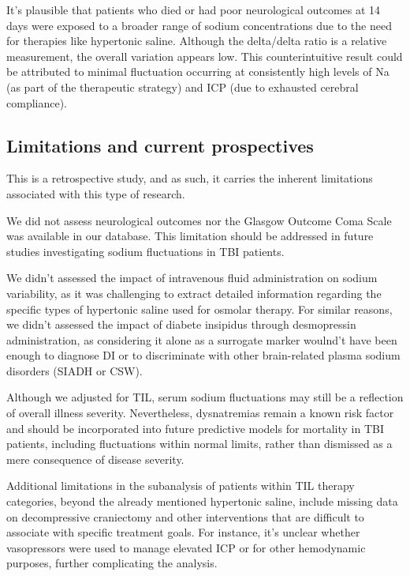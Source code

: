 It’s plausible that patients who died or had poor neurological outcomes at 14 days were exposed to a broader range of sodium concentrations due to the need for therapies like hypertonic saline. Although the delta/delta ratio is a relative measurement, the overall variation appears low. This counterintuitive result could be attributed to minimal fluctuation occurring at consistently high levels of Na (as part of the therapeutic strategy) and ICP (due to exhausted cerebral compliance).


\subsection{Limitations and current prospectives}
This is a retrospective study, and as such, it carries the inherent limitations associated with this type of research.

We did not assess neurological outcomes nor the Glasgow Outcome Coma Scale was available in our database. This limitation should be addressed in future studies investigating sodium fluctuations in TBI patients.

We didn't assessed the impact of intravenous fluid administration on sodium variability, as it was challenging to extract detailed information regarding the specific types of hypertonic saline\cite{holdenHypertonicSalineUse2023a} used for osmolar therapy.
For similar reasons, we didn't assessed the impact of diabete insipidus through desmopressin administration, as considering it alone as a surrogate marker woulnd't have been enough to diagnose DI or to discriminate with other brain-related plasma sodium disorders (SIADH or CSW). 

Although we adjusted for TIL, serum sodium fluctuations may still be a reflection of overall illness severity. Nevertheless, dysnatremias remain a known risk factor and should be incorporated into future predictive models for mortality in TBI patients, including fluctuations within normal limits, rather than dismissed as a mere consequence of disease severity.

Additional limitations in the subanalysis of patients within TIL therapy categories, beyond the already mentioned hypertonic saline, include missing data on decompressive craniectomy\cite{kimRecentUpdatesControversies2023a} and other interventions that are difficult to associate with specific treatment goals. For instance, it’s unclear whether vasopressors were used to manage elevated ICP or for other hemodynamic purposes, further complicating the analysis.

